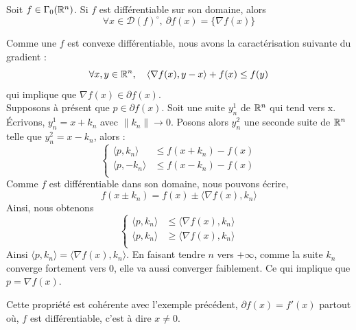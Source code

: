 \documentclass[a4paper,12pt]{article}
\begin{document}
\begin{propriete}
Soit $f\in\Gamma_0(\mathbb{R}^n)$. Si $f$ est différentiable sur son domaine, alors 
$$
\forall x\in \mathcal{D}(f)^{\circ},\ \partial f(x) = \{\nabla f(x)\}
$$
\end{propriete}
\begin{preuve}
Comme une $f$ est convexe différentiable, nous avons la caractérisation suivante du gradient : 
$$
\forall x,y\in\mathbb{R}^n,\quad \langle \nabla f (x) ,y-x\rangle +f(x) \leq f(y)
$$
qui implique que $\nabla f(x) \in\partial f(x)$.\\
Supposons à présent que $p\in\partial f(x)$. Soit une suite $y_n^1$ de $\mathbb{R}^n$ qui tend vers x. Écrivons, $y_n^1=x+k_n$ avec $\|k_n\|\rightarrow 0$. Posons alors $y_n^2$ une seconde suite de $\mathbb{R}^n$ telle que $y_n^2= x-k_n$, alors : 
$$
\left\{
\begin{array}{cc}
\langle p, k_n\rangle &\leq f(x +k_n) - f(x) \\
\langle p,-k_n\rangle & \leq f(x-k_n)-f(x) \\
\end{array}
\right.
$$
Comme $f$ est différentiable dans son domaine, nous pouvons écrire, 
$$
f(x\pm k_n)=f(x) \pm \langle \nabla f(x), k_n\rangle
$$
Ainsi, nous obtenons
$$
\left\{
\begin{array}{cc}
\langle p, k_n\rangle &\leq \langle \nabla f(x), k_n\rangle \\
\langle p, k_n\rangle &\geq \langle \nabla f(x), k_n\rangle \\
\end{array}
\right.
$$
Ainsi $\langle p,k_n \rangle = \langle \nabla f(x),k_n\rangle$. En faisant tendre $n$ vers $+\infty$, comme la suite $k_n$ converge fortement vers $0$, elle va aussi converger faiblement. Ce qui implique que $p=\nabla f(x)$. 
\end{preuve}
Cette propriété est cohérente avec l'exemple précédent, $\partial f(x) =f'(x)$ partout où, $f$ est différentiable, c'est à dire $x\neq 0$. 
\end{document}
